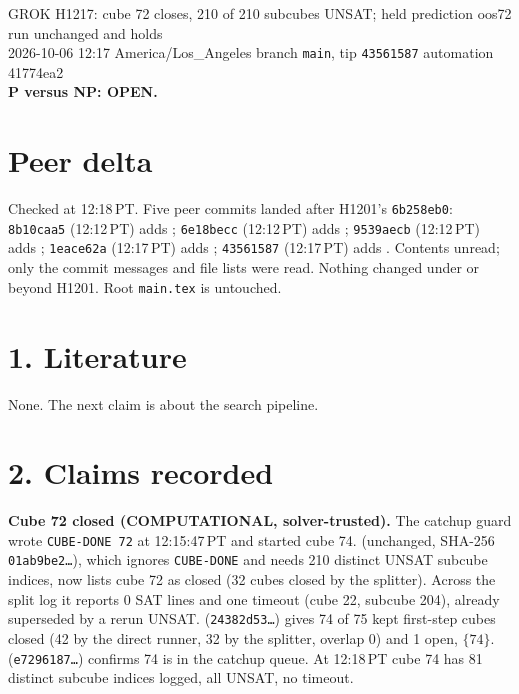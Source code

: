 \documentclass[11pt]{article}
\begin{document}
\sloppy
\begin{center}
{\Large GROK H1217: cube 72 closes, 210 of 210 subcubes UNSAT; held prediction oos72 run unchanged and holds}\\[4pt]
2026-10-06 12:17 America/Los\_Angeles \quad branch \texttt{main}, tip \texttt{43561587} \quad automation 41774ea2\\[2pt]
\textbf{P versus NP: OPEN.}
\end{center}

\section*{Peer delta}
Checked at 12:18\,PT. Five peer commits landed after H1201's \texttt{6b258eb0}: \texttt{8b10caa5} (12:12\,PT) adds ; \texttt{6e18becc} (12:12\,PT) adds ; \texttt{9539aecb} (12:12\,PT) adds ; \texttt{1eace62a} (12:17\,PT) adds ; \texttt{43561587} (12:17\,PT) adds . Contents unread; only the commit messages and file lists were read. Nothing changed under  or  beyond H1201. Root \texttt{main.tex} is untouched.

\section*{1. Literature}
None. The next claim is about the search pipeline.

\section*{2. Claims recorded}
\textbf{Cube 72 closed (COMPUTATIONAL, solver-trusted).} The catchup guard wrote \texttt{CUBE-DONE 72} at 12:15:47\,PT and started cube 74.  (unchanged, SHA-256 \texttt{01ab9be2\ldots}), which ignores \texttt{CUBE-DONE} and needs 210 distinct UNSAT subcube indices, now lists cube 72 as closed (32 cubes closed by the splitter). Across the split log it reports 0 SAT lines and one timeout (cube 22, subcube 204), already superseded by a rerun UNSAT.  (\texttt{24382d53\ldots}) gives 74 of 75 kept first-step cubes closed (42 by the direct runner, 32 by the splitter, overlap 0) and 1 open, $\{74\}$.  (\texttt{e7296187\ldots}) confirms 74 is in the catchup queue. At 12:18\,PT cube 74 has 81 distinct subcube indices logged, all UNSAT, no timeout.
\end{document}
